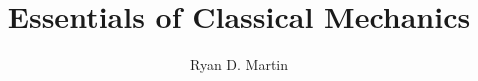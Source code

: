 \documentclass[10pt]{report}
\begin{document}
\title{Essentials of Classical Mechanics}
\author{Ryan D. Martin}
\maketitle
\tableofcontents
{}
















%
\end{document}
